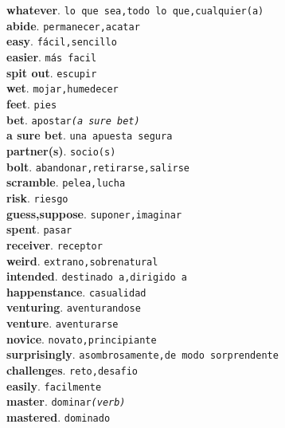 \documentclass[twocolumn]{article}
\begin{document}
	\textsf{\textbf{whatever}}. \texttt{lo que sea,todo lo que,cualquier(a)}\\
	\textsf{\textbf{abide}}. \texttt{permanecer,acatar}\\
	\textsf{\textbf{easy}}. \texttt{f\'acil,sencillo}\\
	\textsf{\textbf{easier}}. \texttt{m\'as facil}\\
	\textsf{\textbf{spit out}}. \texttt{escupir}\\
	\textsf{\textbf{wet}}. \texttt{mojar,humedecer}\\
	\textsf{\textbf{feet}}. \texttt{pies}\\
	\textsf{\textbf{bet}}. \texttt{apostar{\scriptsize \textsl{(a sure bet)}}}\\
	\textsf{\textbf{a sure bet}}. \texttt{una apuesta segura}\\
	\textsf{\textbf{partner(s)}}. \texttt{socio(s)}\\
	\textsf{\textbf{bolt}}. \texttt{abandonar,retirarse,salirse}\\
	\textsf{\textbf{scramble}}. \texttt{pelea,lucha}\\
	\textsf{\textbf{risk}}. \texttt{riesgo}\\
	\textsf{\textbf{guess,suppose}}. \texttt{suponer,imaginar}\\
	\textsf{\textbf{spent}}. \texttt{pasar}\\
	\textsf{\textbf{receiver}}. \texttt{receptor}\\
	\textsf{\textbf{weird}}. \texttt{extrano,sobrenatural}\\
	\textsf{\textbf{intended}}. \texttt{destinado a,dirigido a}\\
	\textsf{\textbf{happenstance}}. \texttt{casualidad}\\
	\textsf{\textbf{venturing}}. \texttt{aventurandose}\\
	\textsf{\textbf{venture}}. \texttt{aventurarse}\\
	\textsf{\textbf{novice}}. \texttt{novato,principiante}\\
	\textsf{\textbf{surprisingly}}. \texttt{asombrosamente,de modo sorprendente}\\
	\textsf{\textbf{challenges}}. \texttt{reto,desafio}\\
	\textsf{\textbf{easily}}. \texttt{facilmente}\\
	\textsf{\textbf{master}}. \texttt{dominar{\scriptsize \textsl{(verb)}}}\\
	\textsf{\textbf{mastered}}. \texttt{dominado}\\
\end{document}
